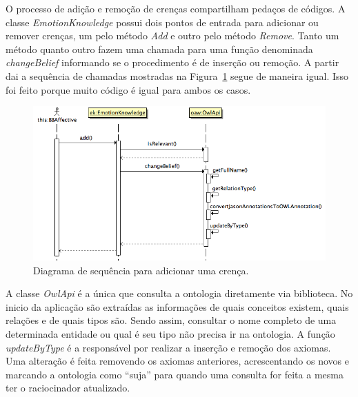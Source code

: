 O processo de adição e remoção de crenças compartilham pedaços de códigos. A
classe \emph{EmotionKnowledge} possui dois pontos de entrada para adicionar ou
remover crenças, um pelo método \emph{Add} e outro pelo método \emph{Remove}.
Tanto um método quanto outro fazem uma chamada para uma função denominada
\emph{changeBelief} informando se o
procedimento é de inserção ou remoção. A partir dai a sequência de chamadas
mostradas na Figura~\ref{fig:shareBelief} segue de maneira igual. Isso foi
feito porque muito código é igual para ambos os casos.

\begin{figure}
  \centering
  \includegraphics[width=12cm]{figuras/shareBelief.png}
  \caption{Diagrama de sequência para adicionar uma crença.}
  \label{fig:shareBelief}
\end{figure}

A classe \emph{OwlApi} é a única que consulta a ontologia diretamente via
biblioteca. No inicio da aplicação são extraídas as informações de quais
conceitos existem, quais relações e de quais tipos são. Sendo assim,
consultar o nome completo de uma determinada entidade ou qual é seu tipo não
precisa ir na ontologia. A função \emph{updateByType} é a responsável por
realizar a inserção e remoção dos axiomas. Uma alteração é feita removendo
os axiomas anteriores, acrescentando os novos e marcando a ontologia como
``suja'' para quando uma consulta for feita a mesma ter o raciocinador
atualizado.

